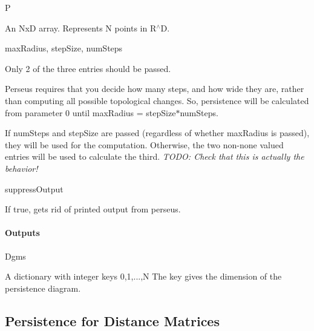 \begin{DoxyItemize}
\item P
\begin{DoxyItemize}
\item An NxD array. Represents N points in R$^\wedge$D.
\end{DoxyItemize}
\item max\+Radius, step\+Size, num\+Steps
\begin{DoxyItemize}
\item Only 2 of the three entries should be passed.
\item Perseus requires that you decide how many steps, and how wide they are, rather than computing all possible topological changes. So, persistence will be calculated from parameter 0 until max\+Radius = step\+Size$\ast$num\+Steps.
\item If num\+Steps and step\+Size are passed (regardless of whether max\+Radius is passed), they will be used for the computation. Otherwise, the two non-\/none valued entries will be used to calculate the third. {\itshape T\+O\+DO\+: Check that this is actually the behavior!}
\end{DoxyItemize}
\item suppress\+Output
\begin{DoxyItemize}
\item If true, gets rid of printed output from perseus.
\end{DoxyItemize}
\end{DoxyItemize}

\paragraph*{Outputs}


\begin{DoxyItemize}
\item Dgms
\begin{DoxyItemize}
\item A dictionary with integer keys 0,1,...,N The key gives the dimension of the persistence diagram.
\end{DoxyItemize}
\end{DoxyItemize}





\subsection*{Persistence for Distance Matrices}

